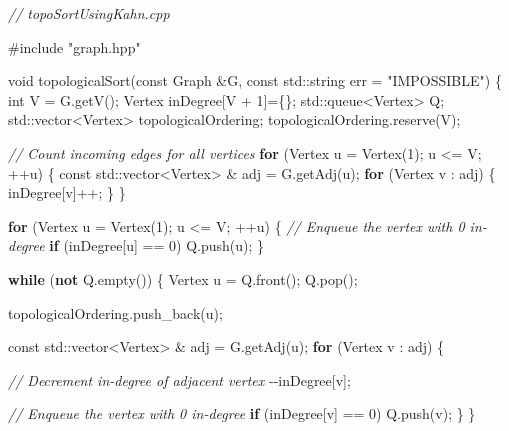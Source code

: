 \documentclass[
]{article}
\newenvironment{Shaded}{}{}
\newcommand{\AttributeTok}[1]{\textcolor[rgb]{0.49,0.56,0.16}{#1}}
\newcommand{\BuiltInTok}[1]{#1}
\newcommand{\CommentTok}[1]{\textcolor[rgb]{0.38,0.63,0.69}{\textit{#1}}}
\newcommand{\ControlFlowTok}[1]{\textcolor[rgb]{0.00,0.44,0.13}{\textbf{#1}}}
\newcommand{\DataTypeTok}[1]{\textcolor[rgb]{0.56,0.13,0.00}{#1}}
\newcommand{\DecValTok}[1]{\textcolor[rgb]{0.25,0.63,0.44}{#1}}
\newcommand{\ImportTok}[1]{#1}
\newcommand{\KeywordTok}[1]{\textcolor[rgb]{0.00,0.44,0.13}{\textbf{#1}}}
\newcommand{\NormalTok}[1]{#1}
\newcommand{\PreprocessorTok}[1]{\textcolor[rgb]{0.74,0.48,0.00}{#1}}
\newcommand{\StringTok}[1]{\textcolor[rgb]{0.25,0.44,0.63}{#1}}
\begin{document}
\begin{Shaded}
\begin{Highlighting}[]
\CommentTok{// topoSortUsingKahn.cpp}

\PreprocessorTok{\#include }\ImportTok{"graph.hpp"}\PreprocessorTok{ }

\DataTypeTok{void}
\NormalTok{topologicalSort(}\AttributeTok{const}\NormalTok{ Graph \&G, }\AttributeTok{const} \BuiltInTok{std::}\NormalTok{string err = }\StringTok{"IMPOSSIBLE"}\NormalTok{) \{}
    \DataTypeTok{int}\NormalTok{ V = G.getV();}
\NormalTok{    Vertex inDegree[V + }\DecValTok{1}\NormalTok{]=\{\};}
    \BuiltInTok{std::}\NormalTok{queue\textless{}Vertex\textgreater{} Q;}
    \BuiltInTok{std::}\NormalTok{vector\textless{}Vertex\textgreater{} topologicalOrdering;}
\NormalTok{    topologicalOrdering.reserve(V);}

    \CommentTok{// Count incoming edges for all vertices}
    \ControlFlowTok{for}\NormalTok{ (Vertex u = Vertex(}\DecValTok{1}\NormalTok{); u \textless{}= V; ++u) \{}
        \AttributeTok{const} \BuiltInTok{std::}\NormalTok{vector\textless{}Vertex\textgreater{} \& adj = G.getAdj(u);}
        \ControlFlowTok{for}\NormalTok{ (Vertex v : adj) \{}
\NormalTok{            inDegree[v]++;}
\NormalTok{        \}}
\NormalTok{    \}}

    \ControlFlowTok{for}\NormalTok{ (Vertex u = Vertex(}\DecValTok{1}\NormalTok{); u \textless{}= V; ++u) \{}
        \CommentTok{// Enqueue the vertex with 0 in{-}degree}
        \ControlFlowTok{if}\NormalTok{ (inDegree[u] == }\DecValTok{0}\NormalTok{) }
\NormalTok{            Q.push(u);          }
\NormalTok{    \}}

    \ControlFlowTok{while}\NormalTok{ (}\KeywordTok{not}\NormalTok{ Q.empty()) \{}
\NormalTok{        Vertex u = Q.front();}
\NormalTok{        Q.pop();}

\NormalTok{        topologicalOrdering.push\_back(u);}

        \AttributeTok{const} \BuiltInTok{std::}\NormalTok{vector\textless{}Vertex\textgreater{} \& adj = G.getAdj(u);}
        \ControlFlowTok{for}\NormalTok{ (Vertex v : adj) \{}

            \CommentTok{// Decrement in{-}degree of adjacent vertex}
\NormalTok{            {-}{-}inDegree[v];}

            \CommentTok{// Enqueue the vertex with 0 in{-}degree}
            \ControlFlowTok{if}\NormalTok{ (inDegree[v] == }\DecValTok{0}\NormalTok{) }
\NormalTok{                Q.push(v);          }
\NormalTok{        \}}
\NormalTok{    \}}


\end{Highlighting}
\end{Shaded}
\end{document}
